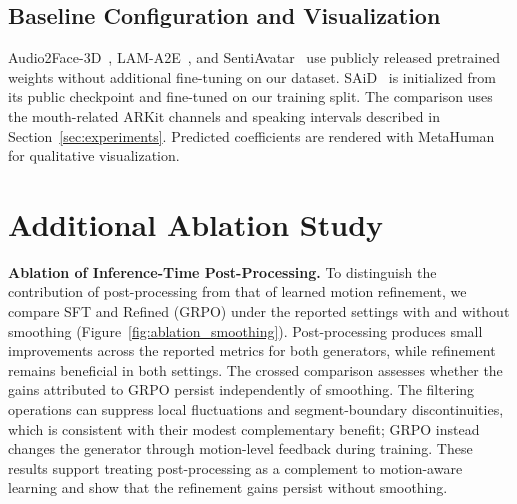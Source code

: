 \subsection{Baseline Configuration and Visualization}
\label{app:baselines}

Audio2Face-3D~\cite{chung2025audio2face}, LAM-A2E~\cite{lam}, and SentiAvatar~\cite{jin2026sentiavatar} use publicly released pretrained weights without additional fine-tuning on our dataset.
SAiD~\cite{park2023said} is initialized from its public checkpoint and fine-tuned on our training split.
The comparison uses the mouth-related ARKit channels and speaking intervals described in Section~\ref{sec:experiments}.
Predicted coefficients are rendered with MetaHuman~\cite{metahuman} for qualitative visualization.

\section{Additional Ablation Study}
\label{app:additional_ablation}



\noindent\textbf{Ablation of Inference-Time Post-Processing.}
To distinguish the contribution of post-processing from that of learned motion refinement, we compare SFT and Refined (GRPO) under the reported settings with and without smoothing (Figure~\ref{fig:ablation_smoothing}).
Post-processing produces small improvements across the reported metrics for both generators, while refinement remains beneficial in both settings.
The crossed comparison assesses whether the gains attributed to GRPO persist independently of smoothing.
The filtering operations can suppress local fluctuations and segment-boundary discontinuities, which is consistent with their modest complementary benefit; GRPO instead changes the generator through motion-level feedback during training.
These results support treating post-processing as a complement to motion-aware learning and show that the refinement gains persist without smoothing.

